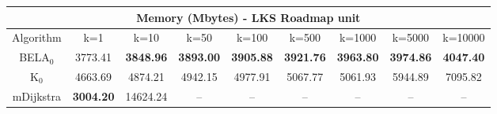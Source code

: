 \begin{tabular}{c|cccccccc}\toprule
\multicolumn{9}{c}{Memory (Mbytes) - LKS Roadmap unit}\\ \midrule
Algorithm & k=1 & k=10 & k=50 & k=100 & k=500 & k=1000 & k=5000 & k=10000 \\ \midrule
BELA$_0$ & 3773.41 & \textbf{3848.96} & \textbf{3893.00} & \textbf{3905.88} & \textbf{3921.76} & \textbf{3963.80} & \textbf{3974.86} & \textbf{4047.40} \\
K$_0$ & 4663.69 & 4874.21 & 4942.15 & 4977.91 & 5067.77 & 5061.93 & 5944.89 & 7095.82 \\
mDijkstra & \textbf{3004.20} & 14624.24 & -- & -- & -- & -- & -- & -- \\ \bottomrule 
\end{tabular}
